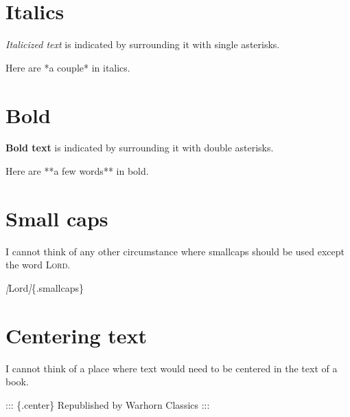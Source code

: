 \documentclass[
]{book}
\newenvironment{Shaded}{\begin{snugshade}}{\end{snugshade}}
\newcommand{\CommentTok}[1]{\textcolor[rgb]{0.56,0.35,0.01}{\textit{#1}}}
\newcommand{\NormalTok}[1]{#1}
\newcommand{\OtherTok}[1]{\textcolor[rgb]{0.56,0.35,0.01}{#1}}
\begin{document}
\hypertarget{italics}{%
\section{Italics}\label{italics}}

\emph{Italicized text} is indicated by surrounding it with single asterisks.

\begin{Shaded}
\begin{Highlighting}[]
\NormalTok{Here are *a couple* in italics.}
\end{Highlighting}
\end{Shaded}

\hypertarget{bold}{%
\section{Bold}\label{bold}}

\textbf{Bold text} is indicated by surrounding it with double asterisks.

\begin{Shaded}
\begin{Highlighting}[]
\NormalTok{Here are **a few words** in bold.}
\end{Highlighting}
\end{Shaded}

\hypertarget{small-caps}{%
\section{Small caps}\label{small-caps}}

I cannot think of any other circumstance where smallcaps should be used except the word \textsc{Lord}.

\begin{Shaded}
\begin{Highlighting}[]
\CommentTok{[}\OtherTok{Lord}\CommentTok{]}\NormalTok{\{.smallcaps\}}
\end{Highlighting}
\end{Shaded}

\hypertarget{centering-text}{%
\section{Centering text}\label{centering-text}}

I cannot think of a place where text would need to be centered in the text of a book.

\begin{Shaded}
\begin{Highlighting}[]
\NormalTok{::: \{.center\}}
\NormalTok{Republished by Warhorn Classics}
\NormalTok{:::}
\end{Highlighting}
\end{Shaded}
\end{document}
